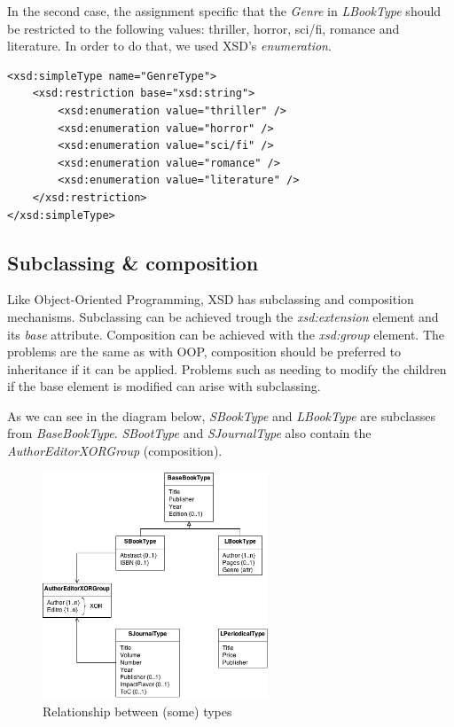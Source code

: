 In the second case, the assignment specific that the \emph{Genre} in
\emph{LBookType} should be restricted to the following values: thriller, horror,
sci/fi, romance and literature. In order to do that, we used XSD's
\emph{enumeration}.
\begin{lstlisting}
<xsd:simpleType name="GenreType">
    <xsd:restriction base="xsd:string">
        <xsd:enumeration value="thriller" />
        <xsd:enumeration value="horror" />
        <xsd:enumeration value="sci/fi" />
        <xsd:enumeration value="romance" />
        <xsd:enumeration value="literature" />
    </xsd:restriction>
</xsd:simpleType>
\end{lstlisting}

\subsection{Subclassing \& composition}

Like Object-Oriented Programming, XSD has subclassing and composition mechanisms.
Subclassing can be achieved trough the \emph{xsd:extension} element and its
\emph{base} attribute. Composition can be achieved with the \emph{xsd:group}
element. The problems are the same as with OOP, composition should be preferred
to inheritance if it can be applied. Problems such as needing to modify the
children if the base element is modified can arise with subclassing.
\newpage

As we can see in the diagram below, \emph{SBookType} and \emph{LBookType} are
subclasses from \emph{BaseBookType}. \emph{SBootType} and \emph{SJournalType}
also contain the \emph{AuthorEditorXORGroup} (composition).\\

\begin{figure}[h!]
    \includegraphics[width=0.6\textwidth]{images/subclassingCompositionDiag.png}
    \centering
    \caption{Relationship between (some) types}
\end{figure}

